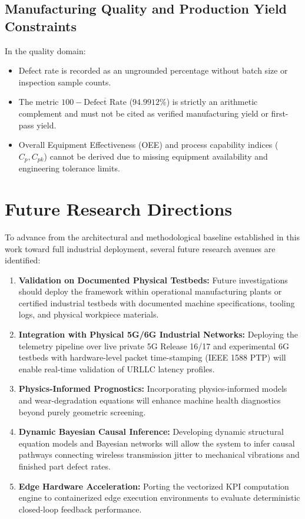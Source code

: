 \documentclass[journal]{IEEEtran}
\begin{document}
\subsection{Manufacturing Quality and Production Yield Constraints}
In the quality domain:
\begin{itemize}
    \item Defect rate is recorded as an ungrounded percentage without batch size or inspection sample counts.
    \item The metric $100 - \overline{\text{Defect Rate}}$ ($94.9912\%$) is strictly an arithmetic complement and must not be cited as verified manufacturing yield or first-pass yield.
    \item Overall Equipment Effectiveness (OEE) and process capability indices ($C_p, C_{pk}$) cannot be derived due to missing equipment availability and engineering tolerance limits.
\end{itemize}

\section{Future Research Directions}
\label{sec:future_work}

To advance from the architectural and methodological baseline established in this work toward full industrial deployment, several future research avenues are identified:
\begin{enumerate}
    \item \textbf{Validation on Documented Physical Testbeds:} Future investigations should deploy the framework within operational manufacturing plants or certified industrial testbeds with documented machine specifications, tooling logs, and physical workpiece materials.
    \item \textbf{Integration with Physical 5G/6G Industrial Networks:} Deploying the telemetry pipeline over live private 5G Release 16/17 and experimental 6G testbeds with hardware-level packet time-stamping (IEEE 1588 PTP) will enable real-time validation of URLLC latency profiles.
    \item \textbf{Physics-Informed Prognostics:} Incorporating physics-informed models and wear-degradation equations will enhance machine health diagnostics beyond purely geometric screening.
    \item \textbf{Dynamic Bayesian Causal Inference:} Developing dynamic structural equation models and Bayesian networks will allow the system to infer causal pathways connecting wireless transmission jitter to mechanical vibrations and finished part defect rates.
    \item \textbf{Edge Hardware Acceleration:} Porting the vectorized KPI computation engine to containerized edge execution environments to evaluate deterministic closed-loop feedback performance.
\end{enumerate}
\end{document}
